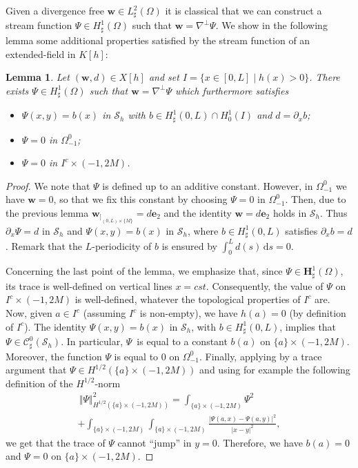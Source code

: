 \documentclass[10pt]{amsart}
\let\mathcal\mathscr
\newtheorem{lemma}[theorem]{Lemma}
\theoremstyle{remark}
\theoremstyle{definition}
\newcommand{\norme}[1]{\,\Vert #1\Vert}
\newcommand{\dd}{\,\mathrm{d}}
\newcommand{\wg}{\boldsymbol{w}}
\newcommand{\BS}[1]{\boldsymbol{#1}}
\begin{document}
Given a divergence free $\wg \in {L}^2_{\sharp}(\Omega)$
it is classical that we can construct a stream function $\Psi \in {H}^1_{\sharp}(\Omega)$ such that $\wg = \nabla^{\bot} \Psi$. We show in the following lemma some additional properties satisfied by the stream function of an extended-field in $K[h]$:

\begin{lemma}\label{lemma.X[h]}
Let $(\wg, d)\in X[h]$ and set $I=\{x\in[0,L]\mid h(x)>0\}$. There exists $\Psi \in {H}^1_\sharp(\Omega)$ such that $\wg=\nabla^\perp\Psi$ which furthermore satisfies
\begin{itemize}
\item $\Psi(x,y)=b(x)$ in $\mathcal{S}_h$ with $b\in H^{1}_{\sharp}(0,L) \cap H^{1}_0(I)$ and $d = \partial_x b$;
\item $\Psi =0$ in $\Omega_{-1}^0$;
\item $\Psi=0$ in $I^{c}\times(-1,2M)$.
\end{itemize}
\end{lemma}
\begin{proof}
We note that $\Psi$ is defined up to an additive constant.
However, in $\Omega_{-1}^0$ we have $\wg=0$, so that we fix this constant by choosing $\Psi=0$ in $\Omega_{-1}^0$. Then,
due to the previous lemma $\wg_{\vert_{(0, L)\times \{M\}}}= d\BS{e}_{2}$ and the identity $\wg=d\BS{e}_{2}$ holds in $\mathcal{S}_{h}$. Thus $\partial_{x}\Psi=d$ in $\mathcal{S}_{h}$ and $\Psi(x,y)=b(x)$ in $\mathcal{S}_{h}$, where $b\in H^{1}_{\sharp}(0,L)$ satisfies $\partial_x b = d$. Remark that the $L$-periodicity of $b$ is ensured by $\int_{0}^{L}d(s)\dd s =0$.

Concerning the last point of the lemma, we emphasize that,
since $\Psi \in \BS{H}^1_{\sharp}(\Omega)$, its trace is well-defined
on vertical lines $x=cst$. Consequently, the value of $\Psi$
on $I^{c} \times (-1,2M)$ is well-defined, whatever the topological properties of $I^c$ are. Now, given $a \in I^{c}$ (assuming $I^{c}$ is non-empty), we have $h(a)=0$ (by definition of $I^c$). The identity $\Psi(x,y)=b(x)$ in $ \mathcal{S}_{h}$, with $b\in H^{1}_{\sharp}(0,L)$, implies that $\Psi\in\mathcal{C}_\sharp^{0}(\mathcal{S}_{h})$. In particular, $\Psi$~is equal to a constant $b(a)$ on $\{a\}\times(-1,2M)$. Moreover, the function $\Psi$ is equal to $0$ on $\Omega_{-1}^{0}$.
Finally, applying by a trace argument that $\Psi \in H^{1/2}(\{a\}\times (-1,2M))$ and using for example the following definition of the $H^{1/2}$-norm\vspace*{-3pt}
\begin{multline*}\norme{\Psi}_{H^{1/2}(\{a\}\times(-1,2M))}^{2} = \int_{\{a\}\times(-1,2M)}\Psi^{2} \\[-5pt]
+ \int_{\{a\}\times(-1,2M)}\int_{\{a\}\times(-1,2M)}\frac{\vert\Psi(a,x)-\Psi(a,y)\vert^{2}}{\vert x-y\vert^{2}},
\end{multline*}
we get that the trace of $\Psi$ cannot ``jump'' in $y=0$.
Therefore, we have $b(a)=0$ and $\Psi=0$ on $\{a\}\times(-1,2M)$.
\end{proof}
\end{document}
